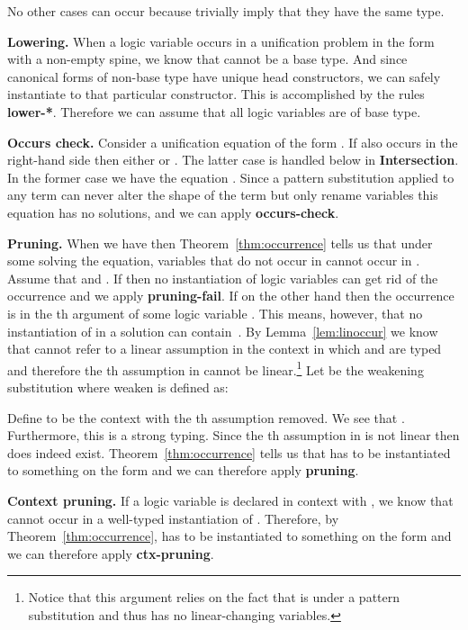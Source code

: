 \documentclass{eptcs}
\theoremstyle{definition}
\begin{document}
No other cases can occur because  trivially imply that
they have the same type.

\medskip \noindent\textbf{Lowering.}
When a logic variable occurs in a unification problem in the form
 with a non-empty spine, we know that  cannot be a
base type.  And since canonical forms of non-base type have unique head
constructors, we can safely instantiate  to that particular
constructor.  This is accomplished by the rules \textbf{lower-*}.
Therefore we can assume that all logic variables are of base type.

\medskip \noindent\textbf{Occurs check.}
Consider a unification equation of the form .  If 
also occurs in the right-hand side then either  or
.  The latter case is handled below in \textbf{Intersection}.
In the former case we have the equation .
Since a pattern substitution  applied to any term can never alter the
shape of the term but only rename variables this equation has no
solutions, and we can apply \textbf{occurs-check}.

\medskip \noindent\textbf{Pruning.}
When we have  then Theorem~\ref{thm:occurrence} tells us
that under some  solving the equation,
variables that do not occur in  cannot occur in .  Assume
that  and .  If  then no
instantiation of logic variables can get rid of the occurrence and
we apply \textbf{pruning-fail}.  If on the other hand
 then the occurrence is in the th argument
of some logic variable .  This means, however, that no instantiation
of  in a solution can contain~.
By Lemma~\ref{lem:linoccur} we know that
 cannot refer to a linear assumption in the context in which 
and  are typed and therefore the th assumption in 
cannot be linear.\footnote{Notice that this argument relies on the fact
that  is under a pattern substitution and thus has no linear-changing
variables.}
Let  be the weakening substitution 
where \textsf{weaken} is defined as:

Define  to be the context  with the th assumption removed.
We see that .
Furthermore, this is a strong typing.
Since the th assumption in  is not linear then
 does indeed exist.
Theorem~\ref{thm:occurrence} tells us that  has to be
instantiated to something on the form  and we can therefore apply
\textbf{pruning}.

\medskip \noindent\textbf{Context pruning.}
If a logic variable  is declared in context
 with ,
we know that  cannot occur in a well-typed instantiation of .
Therefore, by Theorem~\ref{thm:occurrence},  has to be
instantiated to something on the form 
and we can therefore apply \textbf{ctx-pruning}.
\end{document}
